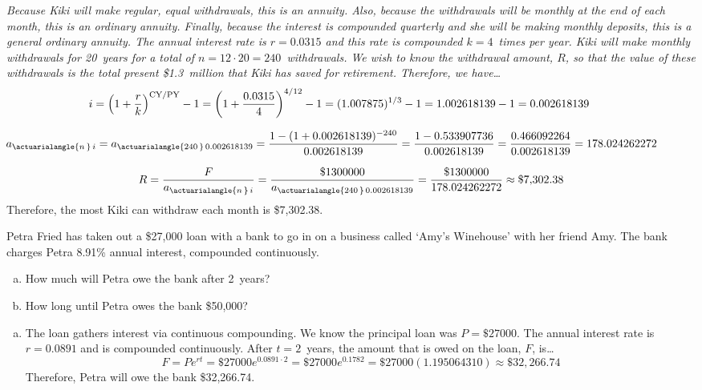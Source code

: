 \documentclass[12pt,letterpaper]{exam}
\begin{document}
\begin{questions}
{\itshape 
\sol Because Kiki will make regular, equal withdrawals, this is an annuity. Also, because the withdrawals will be monthly at the end of each month, this is an ordinary annuity. Finally, because the interest is compounded quarterly and she will be making monthly deposits, this is a general ordinary annuity. The annual interest rate is $r= 0.0315$ and this rate is compounded $k= 4$~times per year. Kiki will make monthly withdrawals for 20~years for a total of $n= 12 \cdot 20= 240$~withdrawals. We wish to know the withdrawal amount, $R$, so that the value of these withdrawals is the total present \$1.3~million that Kiki has saved for retirement. Therefore, we have\dots
	\[
	\hspace{-0.75cm} i= \left(1 + \dfrac{r}{k} \right)^{\text{CY}/\text{PY}} - 1= \left(1 + \dfrac{0.0315}{4} \right)^{4/12} - 1= (1.007875)^{1/3} - 1= 1.002618139 - 1= 0.002618139
	\] \par\vspace{0.1cm}
	\[
	\hspace{-1.25cm} a_{\actuarialangle{n\,}\, i}= a_{\actuarialangle{240\,}\, 0.002618139}= \dfrac{1 - (1 + 0.002618139)^{-240}}{0.002618139}= \dfrac{1 - 0.533907736}{0.002618139}= \dfrac{0.466092264}{0.002618139}= 178.024262272
	\] \par\vspace{0.1cm}
	\[
	R= \dfrac{F}{a_{\actuarialangle{n\,}\, i}}= \dfrac{\$1300000}{a_{\actuarialangle{240\,}\, 0.002618139}}= \dfrac{\$1300000}{178.024262272} \approx \$7,\!302.38
	\] \pspace
Therefore, the most Kiki can withdraw each month is \$7,302.38. 
}




\newpage
\question[10] Petra Fried has taken out a \$27,000 loan with a bank to go in on a business called `Amy's Winehouse' with her friend Amy. The bank charges Petra 8.91\% annual interest, compounded continuously. 
	\begin{enumerate}[(a)]
	\item How much will Petra owe the bank after 2~years?
	\item How long until Petra owes the bank \$50,000? 
	\end{enumerate} \pspace

{\itshape
\sol 
\begin{enumerate}[(a)]
\item The loan gathers interest via continuous compounding. We know the principal loan was $P= \$27000$. The annual interest rate is $r= 0.0891$ and is compounded continuously. After $t= 2$~years, the amount that is owed on the loan, $F$, is\dots
	\[
	F= Pe^{rt}= \$27000 e^{0.0891 \cdot 2}= \$27000 e^{0.1782}= \$27000 (1.195064310) \approx \$32,\!266.74
	\]
Therefore, Petra will owe the bank \$32,266.74. \pspace


\end{enumerate}}
\end{questions}
\end{document}

